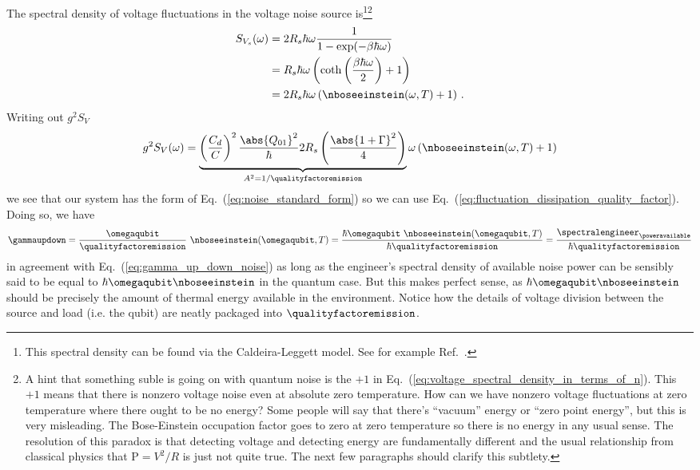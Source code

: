 The spectral density of voltage fluctuations in the voltage noise source is\footnote{This spectral density can be found via the Caldeira-Leggett model. See for example Ref.~\cite{Vool:quantum_electromagnetics:2017}.}\footnote{A hint that something suble is going on with quantum noise is the $+1$ in Eq.~(\ref{eq:voltage_spectral_density_in_terms_of_n}). This $+1$ means that there is nonzero voltage noise even at absolute zero temperature. How can we have nonzero voltage fluctuations at zero temperature where there ought to be no energy? Some people will say that there's ``vacuum'' energy or ``zero point energy'', but this is very misleading. The Bose-Einstein occupation factor goes to zero at zero temperature so there is no energy in any usual sense. The resolution of this paradox is that detecting voltage and detecting energy are fundamentally different and the usual relationship from classical physics that $\text{P} = V^2/R$ is just not quite true. The next few paragraphs should clarify this subtlety.}
\begin{align}
  S_{V_s}(\omega)
  &= 2 R_s \hbar \omega \frac{1}{1 - \exp(-\beta \hbar \omega)} \\
  &= R_s \hbar \omega \left( \coth \left(\frac{\beta \hbar \omega}{2} \right) + 1 \right) \\
  &= 2 R_s \hbar \omega \left( \nboseeinstein(\omega, T) + 1 \right)
  \, .
  \label{eq:voltage_spectral_density_in_terms_of_n}
\end{align}
Writing out $g^2 S_V$ 
\begin{equation}
  g^2 S_V(\omega) = \underbrace{\left( \frac{C_d}{C} \right)^2 \frac{\abs{Q_{01}}^2}{\hbar} 2 R_s \left( \frac{\abs{1 + \Gamma}^2}{4}\right)}_{A^2 = 1 / \qualityfactoremission} \omega \left( \nboseeinstein(\omega, T) + 1 \right) 
\end{equation}
we see that our system has the form of Eq.~(\ref{eq:noise_standard_form})
so we can use Eq.~(\ref{eq:fluctuation_dissipation_quality_factor}).
Doing so, we have
\begin{equation}
    \gammaupdown
    = \frac{\omegaqubit}{\qualityfactoremission} ~ \nboseeinstein(\omegaqubit, T)
    = \frac{\hbar \omegaqubit~ \nboseeinstein(\omegaqubit, T)}{\hbar \qualityfactoremission}
    = \frac{\spectralengineer_{\poweravailable}}{\hbar \qualityfactoremission}
\end{equation}
in agreement with Eq.~(\ref{eq:gamma_up_down_noise}) as long as the engineer's spectral density of available noise power can be sensibly said to be equal to $\hbar \omegaqubit \nboseeinstein$ in the quantum case.
But this makes perfect sense, as $\hbar \omegaqubit \nboseeinstein$ should be precisely the amount of thermal energy available in the environment.
Notice how the details of voltage division between the source and load (i.e. the qubit) are neatly packaged into $\qualityfactoremission$.

